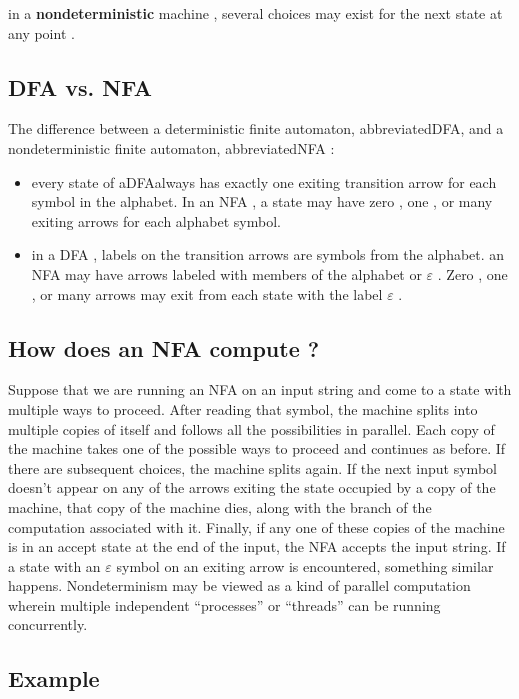 \documentclass[12pt]{article}
\let\epsilon\varepsilon
\begin{document}
\noindent
in a \textbf{nondeterministic} machine , several choices may exist for the next state at any point .


\subsection{DFA vs. NFA}

The difference between a deterministic finite automaton, abbreviatedDFA,
and a nondeterministic finite automaton, abbreviatedNFA :

\begin{itemize}
	\item  every state of aDFAalways has exactly one exiting transition arrow
for each symbol in the alphabet. In an NFA , a state may have zero , one , or many
exiting arrows for each alphabet symbol.
	\item in a DFA , labels on the transition arrows are symbols from the alphabet. an NFA may have arrows
labeled with members of the alphabet or $\epsilon$ . Zero , one , or many arrows may exit
from each state with the label $\epsilon$ .
\end{itemize}


\subsection{How does an NFA compute ?}

Suppose that we are running an NFA on an input
string and come to a state with multiple ways to proceed.
After reading
that symbol, the machine splits into multiple copies of itself and follows all the
possibilities in parallel. Each copy of the machine takes one of the possible ways
to proceed and continues as before. If there are subsequent choices, the machine
splits again. If the next input symbol doesn’t appear on any of the arrows exiting
the state occupied by a copy of the machine, that copy of the machine dies, along
with the branch of the computation associated with it. Finally, if any one of these
copies of the machine is in an accept state at the end of the input, the NFA accepts
the input string.
If a state with an $\epsilon$ symbol on an exiting arrow is encountered, something
similar happens.
Nondeterminism may be viewed as a kind of parallel computation wherein
multiple independent “processes” or “threads” can be running concurrently.



\newpage

\subsection{Example}
\end{document}
